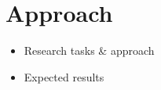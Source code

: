 \section{Approach}
\label{sec:Approach}

\begin{itemize}
	\item Research tasks \& approach
	\item Expected results
\end{itemize}